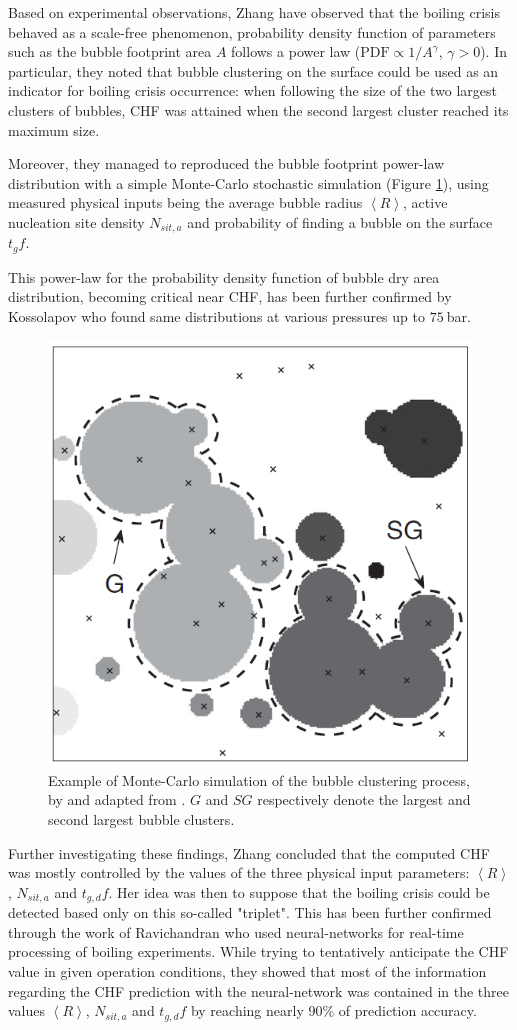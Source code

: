 Based on experimental observations, Zhang \etal \cite{zhang_percolative_2019} have observed that the boiling crisis behaved as a scale-free phenomenon, \ie probability density function of parameters such as the bubble footprint area $A$ follows a power law ($\text{PDF}\propto 1/A^{\gamma}$, $\gamma >0$). In particular, they noted that bubble clustering on the surface could be used as an indicator for boiling crisis occurrence: when following the size of the two largest clusters of bubbles, CHF was attained when the second largest cluster reached its maximum size.

\npar

Moreover, they managed to reproduced the bubble footprint power-law distribution with a simple Monte-Carlo stochastic simulation (Figure \ref{fig:chf_zhang_cluster}), using measured physical inputs being the average bubble radius $\left<R\right>$, active nucleation site density $N_{sit,a}$ and probability of finding a bubble on the surface $t_{g}f$.

\begin{remark*}{}
This power-law for the probability density function of bubble dry area distribution, becoming critical near CHF, has been further confirmed by Kossolapov \cite{kossolapov_experimental_2021} who found same distributions at various pressures up to $75\ $bar.
\end{remark*}

\begin{figure}[!h]
\centering
\includegraphics[width=0.35\linewidth]{img/chf/chf_zhang_cluster.png}
\caption{Example of Monte-Carlo simulation of the bubble clustering process, by and adapted from \cite{zhang_percolative_2019}. $G$ and $SG$ respectively denote the largest and second largest bubble clusters.}
\label{fig:chf_zhang_cluster}
\end{figure}

\npar

Further investigating these findings, Zhang \cite{zhang_new_2022} concluded that the computed CHF was mostly controlled by the values of the three physical input parameters:  $\left<R\right>$, $N_{sit,a}$ and $t_{g,d}f$. Her idea was then to suppose that the boiling crisis could be detected based only on this so-called "triplet". This has been further confirmed through the work of Ravichandran \etal \cite{ravichandran_online_2019, ravichandran_infrared_2022} who used neural-networks for real-time processing of boiling experiments. While trying to tentatively anticipate the CHF value in given operation conditions, they showed that most of the information regarding the CHF prediction with the neural-network was contained in the three values $\left<R\right>$, $N_{sit,a}$ and $t_{g,d}f$ by reaching nearly 90\% of prediction accuracy.

